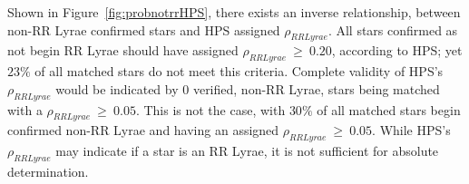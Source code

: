 \documentclass[aps,prb,twocolumn,superscriptaddress]{revtex4-1}
\begin{document}



Shown in Figure~\ref{fig:probnotrrHPS}, there exists an inverse relationship, between non-RR Lyrae confirmed stars and HPS 
assigned $\rho_{RRLyrae}$.   
All stars confirmed as not begin RR Lyrae should have assigned $\rho_{RRLyrae}~\geq~0.20$, according to HPS; yet $23\%$ of 
all matched stars do not meet this criteria.  Complete validity of HPS's $\rho_{RRLyrae}$ would be indicated by 0 verified,
non-RR Lyrae, stars being matched with a $\rho_{RRLyrae}~\geq~0.05$.  This is not the case, with $30\%$ of all matched stars begin 
confirmed non-RR Lyrae and having an assigned $\rho_{RRLyrae}~\geq~0.05$.  While HPS's $\rho_{RRLyrae}$ may indicate if a star is 
an RR Lyrae, it is not sufficient for absolute determination.

\end{document}
